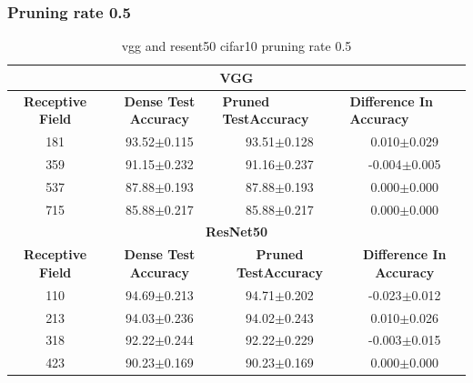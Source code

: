 \subsubsection*{Pruning rate 0.5}
\begin{table}[]
\begin{tabular}{@{}cccc@{}}
\toprule
\multicolumn{4}{c}{\textbf{VGG}}                                                                                                                                  \\ \midrule
\textbf{Receptive Field} & \textbf{Dense Test Accuracy} & \multicolumn{1}{l}{\textbf{Pruned  TestAccuracy}} & \multicolumn{1}{l}{\textbf{Difference In Accuracy}} \\ \midrule
181                      & 93.52$\pm$0.115              & 93.51$\pm$0.128                                   & 0.010$\pm$0.029                                     \\
359                      & 91.15$\pm$0.232              & 91.16$\pm$0.237                                   & -0.004$\pm$0.005                                    \\
537                      & 87.88$\pm$0.193              & 87.88$\pm$0.193                                   & 0.000$\pm$0.000                                     \\
715                      & 85.88$\pm$0.217              & 85.88$\pm$0.217                                   & 0.000$\pm$0.000                                     \\ \midrule
\multicolumn{4}{c}{\textbf{ResNet50}}                                                                                                                             \\ \midrule
\textbf{Receptive Field} & \textbf{Dense Test Accuracy} & \textbf{Pruned  TestAccuracy}                     & \textbf{Difference In Accuracy}                     \\
110                      & 94.69$\pm$0.213              & 94.71$\pm$0.202                                   & -0.023$\pm$0.012                                    \\
213                      & 94.03$\pm$0.236              & 94.02$\pm$0.243                                   & 0.010$\pm$0.026                                     \\
318                      & 92.22$\pm$0.244              & 92.22$\pm$0.229                                   & -0.003$\pm$0.015                                    \\
423                      & 90.23$\pm$0.169              & 90.23$\pm$0.169                                   & 0.000$\pm$0.000                                     \\ \bottomrule
\end{tabular}
\caption{vgg and resent50 cifar10 pruning rate 0.5}
\label{tab:cifar10 pruning rate05}
\end{table}
